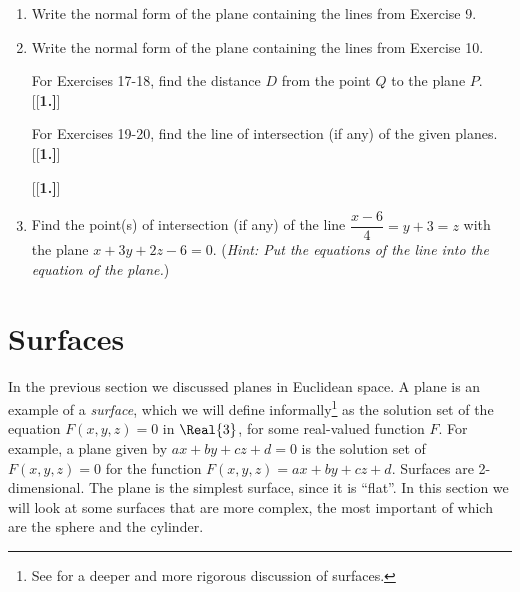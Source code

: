 \begin{enumerate}[\bfseries 1.]
\par\noindent For Exercises 13-14, write the normal form of the plane containing the given points.
[{[\bfseries 1.]}]
 \item Write the normal form of the plane containing the lines from Exercise 9.
 \item Write the normal form of the plane containing the lines from Exercise 10.
\par\noindent For Exercises 17-18, find the distance $D$ from the point $Q$ to the plane $P$.
[{[\bfseries 1.]}]
\par\noindent For Exercises 19-20, find the line of intersection (if any) of the given planes.
[{[\bfseries 1.]}]
[{[\bfseries 1.]}]
 \item Find the point(s) of intersection (if any) of the line $\dfrac{x - 6}{4} = y + 3 = z$ with the plane
 $x + 3y + 2z - 6 = 0$. (\emph{Hint: Put the equations of the line into the equation of the plane.})
\end{enumerate}
\newpage
\section{Surfaces}
In the previous section we discussed planes in Euclidean space. A plane is an example of a \emph{surface}, which we
will define informally\footnote{See \cite{one} for a deeper and more rigorous discussion of surfaces.} as the
solution set of the equation $F(x,y,z) = 0$ in $\Real{3}$, for some real-valued function $F$. For example, a plane
given by $ax + by + cz + d = 0$ is the solution set of $F(x,y,z) = 0$ for the function $F(x,y,z) = ax + by + cz + d$.
Surfaces are 2-dimensional. The plane is the simplest surface, since it is ``flat''. In this
section we will look at some surfaces that are more complex, the most important of which are the sphere and the
cylinder.

